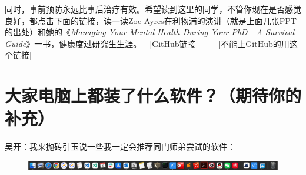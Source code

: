 同时，事前预防永远比事后治疗有效。希望读到这里的同学，不管你现在是否感觉良好，都点击下面的链接，读一读Zoe Ayres在利物浦的演讲（就是上面几张PPT的出处）和她的《\textit{Managing Your Mental Health During Your PhD - A Survival Guide}》一书，健康度过研究生生涯。~~\href{https://github.com/kaiwu-astro/xp_pgrs_unofficial_guide/tree/main/fileshare}{[GitHub链接]}~~~~~\href{https://gitee.com/kaiwu-astro/xp_pgrs_unofficial_guide/tree/main/fileshare}{[不能上GitHub的用这个链接]}

\section{大家电脑上都装了什么软件？（期待你的补充）}

吴开：我来抛砖引玉说一些我一定会推荐同门师弟尝试的软件：
\begin{figure}[H]
    \includegraphics[width=\columnwidth]{author-folder/Kai.Wu/kai_mac_dock.jpg}
\end{figure}
